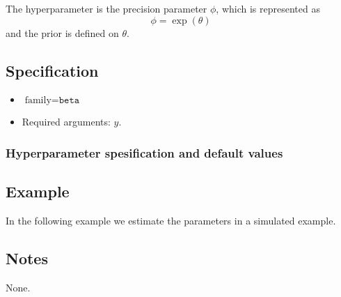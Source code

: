 \documentclass[a4paper,11pt]{article}
\begin{document}
The hyperparameter is the precision parameter $\phi$, which is
represented as
\begin{displaymath}
    \phi = \exp(\theta)
\end{displaymath}
and the prior is defined on $\theta$.

\subsection*{Specification}

\begin{itemize}
\item $\text{family}=\texttt{beta}$
\item Required arguments: $y$.
\end{itemize}

\subsubsection*{Hyperparameter spesification and default values}



\subsection*{Example}

In the following example we estimate the parameters in a simulated
example.


\subsection*{Notes}

None.
\end{document}
